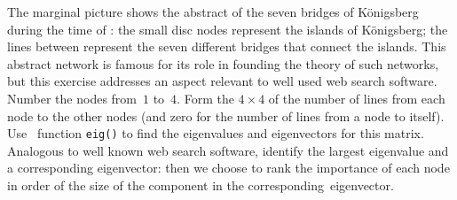 \begin{exercise}  
The marginal picture shows the abstract  of the seven bridges of K\"onigsberg during the time of : the small disc nodes represent the islands of K\"onigsberg; the lines between represent the seven different bridges that connect the islands.
%
This abstract network is famous for its role in founding the theory of such networks, but this exercise addresses an aspect relevant to well used web search software.
Number the nodes from~\(1\) to~\(4\).
Form the \(4\times 4\)  of the number of lines from each node to the other nodes (and zero for the number of lines from a node to itself).
Use \script\ function \verb|eig()| to find the eigenvalues and eigenvectors for this matrix.
Analogous to well known web search software, identify the largest eigenvalue and a corresponding eigenvector:  then we choose to rank the importance of each node in order of the size of the component in the corresponding~eigenvector.
\end{exercise}



